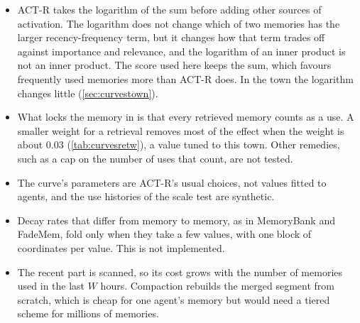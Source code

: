 \begin{itemize}
\item ACT-R takes the logarithm of the sum before adding other sources of activation. The logarithm does not change which of two memories has the larger recency-frequency term, but it changes how that term trades off against importance and relevance, and the logarithm of an inner product is not an inner product. The score used here keeps the sum, which favours frequently used memories more than ACT-R does. In the town the logarithm changes little (\cref{sec:curvestown}).
\item What locks the memory in is that every retrieved memory counts as a use. A smaller weight for a retrieval removes most of the effect when the weight is about 0.03 (\cref{tab:curvesretw}), a value tuned to this town. Other remedies, such as a cap on the number of uses that count, are not tested.
\item The curve's parameters are ACT-R's usual choices, not values fitted to agents, and the use histories of the scale test are synthetic.
\item Decay rates that differ from memory to memory, as in MemoryBank and FadeMem, fold only when they take a few values, with one block of coordinates per value. This is not implemented.
\item The recent part is scanned, so its cost grows with the number of memories used in the last $W$ hours. Compaction rebuilds the merged segment from scratch, which is cheap for one agent's memory but would need a tiered scheme for millions of memories.
\end{itemize}
